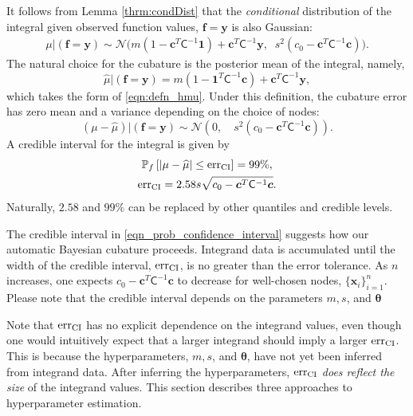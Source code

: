 \documentclass{iitthesis}          %
\newcommand{\bm}[1]{\boldsymbol{#1}}
\newcommand{\vtheta}{{\bm{\theta}}}
\newcommand{\vc}{\bm{c}}
\newcommand{\vf}{\bm{f}}
\newcommand{\vx}{\bm{x}}
\newcommand{\vy}{\bm{y}}
\newcommand{\vone}{\bm{1}}
\newcommand{\mC}{\mathsf{C}}
\newcommand{\calN}{\mathcal{N}}
\newcommand{\hmu}{\widehat{\mu}}
\newcommand{\err}{\textup{err}}
\begin{document}
It follows from Lemma \ref{thrm:condDist} that the \emph{conditional} distribution of the integral given observed function values, $\vf = \vy$ is also Gaussian:
\begin{align} \label{eqn:condInteg}
\mu | (\vf = \vy) \sim \calN \bigl(m (1 - \vc^T \mC^{-1} \vone)  + \vc^T \mC^{-1} \vy, \;\;
s^2(c_0  -\vc ^T \mC^{-1} \vc) \bigr).
\end{align}
The natural choice for  the cubature is the posterior mean of the integral, namely, 
\begin{equation}
\label{eqn:BayesCub}
\widehat{\mu}  \vert ( \vf = \vy)
= m(1 - \vone^T  \mC^{-1}\vc )
+ \vc^T \mC^{-1} \vy,
\end{equation}
which takes the form of \eqref{eqn:defn_hmu}.
Under this definition, the cubature error has zero mean and a variance depending on the choice of nodes:
\begin{equation*}
(\mu-\hmu) | (\vf = \vy)
 \sim  \calN 
\left(
0, \quad
s^2 (c_0 - \vc^T\mC^{-1}\vc) 
\right).
\end{equation*}
A credible interval for the integral is given by 
\begin{subequations} \label{eqn_prob_confidence_interval}
	\begin{gather}
	\mathbb{P}_f \left[
	|\mu-\hmu| \leq \err_{\textup{CI}}
	\right] = 99\%, \\
	\err_{\textup{CI}} = 2.58 s \sqrt{c_{0} - \vc^T\mC^{-1}\vc}.
	\end{gather}
\end{subequations}
Naturally, $2.58$ and $99\%$ can be replaced by other quantiles and credible levels.


\label{sec:stopping_criteria}

The credible interval in \eqref{eqn_prob_confidence_interval} suggests how our automatic Bayesian cubature proceeds.  Integrand data is accumulated until the width of the credible interval, $\err_{\textup{CI}}$, is no greater than the error tolerance.  As $n$ increases, one expects $c_{0} - \vc^T\mC^{-1}\vc$ to decrease for well-chosen nodes, $\{\vx_i\}_{i=1}^n$. Please note that the credible interval depends on the parameters $m, s$, and $\vtheta$

Note that $\err_{\textup{CI}}$ has no explicit dependence on the integrand values, even though one would intuitively expect that a larger integrand should imply a larger $\err_{\textup{CI}}$.  This is because the hyperparameters, $m, s$, and $\vtheta$, have not yet been inferred from integrand data.  After inferring the hyperparameters, $\err_{\textup{CI}}$ \emph{does reflect the size} of the integrand values. This section describes three approaches to hyperparameter estimation.
\end{document}
